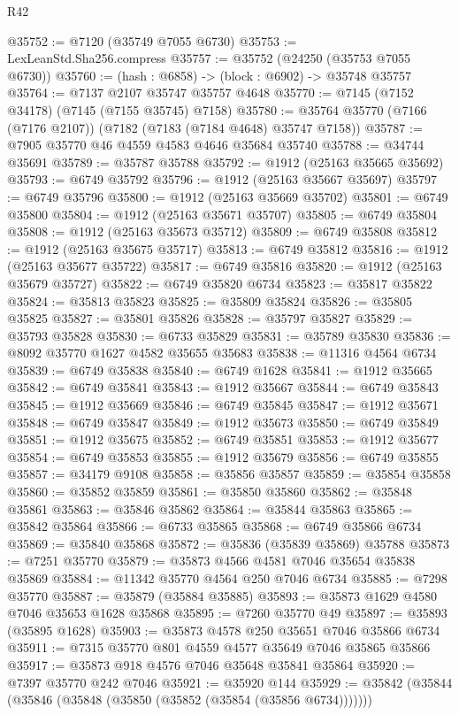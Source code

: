 \begin{lexlean}{R42}
\begin{coremodule}
{@35752 := @7120 (@35749 @7055 @6730)
@35753 := LexLeanStd.Sha256.compress
@35757 := @35752 (@24250 (@35753 @7055 @6730))
@35760 := (hash : @6858) -> (block : @6902) -> @35748 @35757
@35764 := @7137 @2107 @35747 @35757 @4648
@35770 := @7145 (@7152 @34178) (@7145 (@7155 @35745) @7158)
@35780 := @35764 @35770 (@7166 (@7176 @2107)) (@7182 (@7183 (@7184 @4648) @35747 @7158))
@35787 := @7905 @35770 @46 @4559 @4583 @4646 @35684 @35740
@35788 := @34744 @35691
@35789 := @35787 @35788
@35792 := @1912 (@25163 @35665 @35692)
@35793 := @6749 @35792
@35796 := @1912 (@25163 @35667 @35697)
@35797 := @6749 @35796
@35800 := @1912 (@25163 @35669 @35702)
@35801 := @6749 @35800
@35804 := @1912 (@25163 @35671 @35707)
@35805 := @6749 @35804
@35808 := @1912 (@25163 @35673 @35712)
@35809 := @6749 @35808
@35812 := @1912 (@25163 @35675 @35717)
@35813 := @6749 @35812
@35816 := @1912 (@25163 @35677 @35722)
@35817 := @6749 @35816
@35820 := @1912 (@25163 @35679 @35727)
@35822 := @6749 @35820 @6734
@35823 := @35817 @35822
@35824 := @35813 @35823
@35825 := @35809 @35824
@35826 := @35805 @35825
@35827 := @35801 @35826
@35828 := @35797 @35827
@35829 := @35793 @35828
@35830 := @6733 @35829
@35831 := @35789 @35830
@35836 := @8092 @35770 @1627 @4582 @35655 @35683
@35838 := @11316 @4564 @6734
@35839 := @6749 @35838
@35840 := @6749 @1628
@35841 := @1912 @35665
@35842 := @6749 @35841
@35843 := @1912 @35667
@35844 := @6749 @35843
@35845 := @1912 @35669
@35846 := @6749 @35845
@35847 := @1912 @35671
@35848 := @6749 @35847
@35849 := @1912 @35673
@35850 := @6749 @35849
@35851 := @1912 @35675
@35852 := @6749 @35851
@35853 := @1912 @35677
@35854 := @6749 @35853
@35855 := @1912 @35679
@35856 := @6749 @35855
@35857 := @34179 @9108
@35858 := @35856 @35857
@35859 := @35854 @35858
@35860 := @35852 @35859
@35861 := @35850 @35860
@35862 := @35848 @35861
@35863 := @35846 @35862
@35864 := @35844 @35863
@35865 := @35842 @35864
@35866 := @6733 @35865
@35868 := @6749 @35866 @6734
@35869 := @35840 @35868
@35872 := @35836 (@35839 @35869) @35788
@35873 := @7251 @35770
@35879 := @35873 @4566 @4581 @7046 @35654 @35838 @35869
@35884 := @11342 @35770 @4564 @250 @7046 @6734
@35885 := @7298 @35770
@35887 := @35879 (@35884 @35885)
@35893 := @35873 @1629 @4580 @7046 @35653 @1628 @35868
@35895 := @7260 @35770 @49
@35897 := @35893 (@35895 @1628)
@35903 := @35873 @4578 @250 @35651 @7046 @35866 @6734
@35911 := @7315 @35770 @801 @4559 @4577 @35649 @7046 @35865 @35866
@35917 := @35873 @918 @4576 @7046 @35648 @35841 @35864
@35920 := @7397 @35770 @242 @7046
@35921 := @35920 @144
@35929 := @35842 (@35844 (@35846 (@35848 (@35850 (@35852 (@35854 (@35856 @6734)))))))
}
\end{coremodule}
\end{lexlean}
